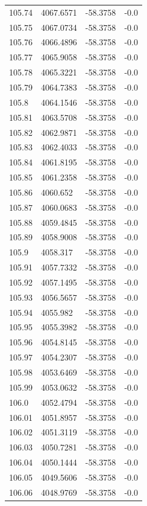 \begin{table}[H]
\begin{tabular}{llll}
105.74 & 4067.6571 & -58.3758 & -0.0 \\
105.75 & 4067.0734 & -58.3758 & -0.0 \\
105.76 & 4066.4896 & -58.3758 & -0.0 \\
105.77 & 4065.9058 & -58.3758 & -0.0 \\
105.78 & 4065.3221 & -58.3758 & -0.0 \\
105.79 & 4064.7383 & -58.3758 & -0.0 \\
105.8 & 4064.1546 & -58.3758 & -0.0 \\
105.81 & 4063.5708 & -58.3758 & -0.0 \\
105.82 & 4062.9871 & -58.3758 & -0.0 \\
105.83 & 4062.4033 & -58.3758 & -0.0 \\
105.84 & 4061.8195 & -58.3758 & -0.0 \\
105.85 & 4061.2358 & -58.3758 & -0.0 \\
105.86 & 4060.652 & -58.3758 & -0.0 \\
105.87 & 4060.0683 & -58.3758 & -0.0 \\
105.88 & 4059.4845 & -58.3758 & -0.0 \\
105.89 & 4058.9008 & -58.3758 & -0.0 \\
105.9 & 4058.317 & -58.3758 & -0.0 \\
105.91 & 4057.7332 & -58.3758 & -0.0 \\
105.92 & 4057.1495 & -58.3758 & -0.0 \\
105.93 & 4056.5657 & -58.3758 & -0.0 \\
105.94 & 4055.982 & -58.3758 & -0.0 \\
105.95 & 4055.3982 & -58.3758 & -0.0 \\
105.96 & 4054.8145 & -58.3758 & -0.0 \\
105.97 & 4054.2307 & -58.3758 & -0.0 \\
105.98 & 4053.6469 & -58.3758 & -0.0 \\
105.99 & 4053.0632 & -58.3758 & -0.0 \\
106.0 & 4052.4794 & -58.3758 & -0.0 \\
106.01 & 4051.8957 & -58.3758 & -0.0 \\
106.02 & 4051.3119 & -58.3758 & -0.0 \\
106.03 & 4050.7281 & -58.3758 & -0.0 \\
106.04 & 4050.1444 & -58.3758 & -0.0 \\
106.05 & 4049.5606 & -58.3758 & -0.0 \\
106.06 & 4048.9769 & -58.3758 & -0.0 \\

\end{tabular}
\end{table}
